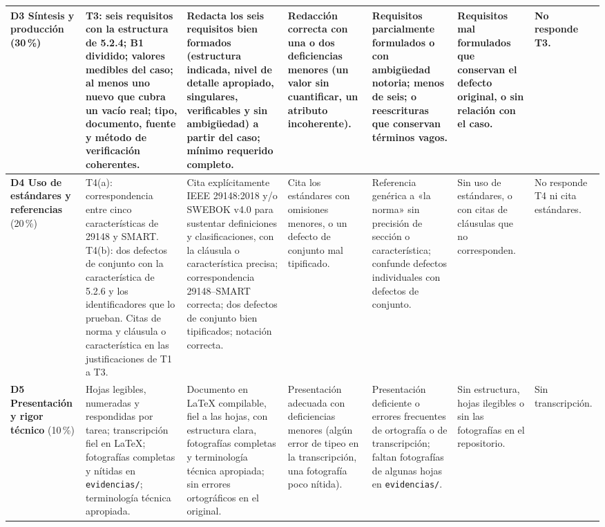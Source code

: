 \documentclass[11pt]{article}
\begin{document}
\begin{landscape}
{\begin{longtable}{|L{2.6cm}|L{4.3cm}|L{3.5cm}|L{3.2cm}|L{3.2cm}|L{3.0cm}|L{1.8cm}|}
				\hline
				\textbf{D3 Síntesis y producción} (30\,\%) & T3: seis requisitos con la estructura de 5.2.4; B1 dividido; valores medibles del caso; al menos uno nuevo que cubra un vacío real; tipo, documento, fuente y método de verificación coherentes. & Redacta los seis requisitos bien formados (estructura indicada, nivel de detalle apropiado, singulares, verificables y sin ambigüedad) a partir del caso; mínimo requerido completo. & Redacción correcta con una o dos deficiencias menores (un valor sin cuantificar, un atributo incoherente). & Requisitos parcialmente formulados o con ambigüedad notoria; menos de seis; o reescrituras que conservan términos vagos. & Requisitos mal formulados que conservan el defecto original, o sin relación con el caso. & No responde T3.\\
				\hline
				\textbf{D4 Uso de estándares y referencias} (20\,\%) & T4(a): correspondencia entre cinco características de 29148 y SMART. T4(b): dos defectos de conjunto con la característica de 5.2.6 y los identificadores que lo prueban. Citas de norma y cláusula o característica en las justificaciones de T1 a T3. & Cita explícitamente IEEE 29148:2018 y/o SWEBOK v4.0 para sustentar definiciones y clasificaciones, con la cláusula o característica precisa; correspondencia 29148--SMART correcta; dos defectos de conjunto bien tipificados; notación correcta. & Cita los estándares con omisiones menores, o un defecto de conjunto mal tipificado. & Referencia genérica a «la norma» sin precisión de sección o característica; confunde defectos individuales con defectos de conjunto. & Sin uso de estándares, o con citas de cláusulas que no corresponden. & No responde T4 ni cita estándares.\\
				\hline
				\textbf{D5 Presentación y rigor técnico} (10\,\%) & Hojas legibles, numeradas y respondidas por tarea; transcripción fiel en \LaTeX{}; fotografías completas y nítidas en \texttt{evidencias/}; terminología técnica apropiada. & Documento en \LaTeX{} compilable, fiel a las hojas, con estructura clara, fotografías completas y terminología técnica apropiada; sin errores ortográficos en el original. & Presentación adecuada con deficiencias menores (algún error de tipeo en la transcripción, una fotografía poco nítida). & Presentación deficiente o errores frecuentes de ortografía o de transcripción; faltan fotografías de algunas hojas en \texttt{evidencias/}. & Sin estructura, hojas ilegibles o sin las fotografías en el repositorio. & Sin transcripción.\\
				\hline
			\end{longtable}
		}
	\end{landscape}
	
\end{document}
